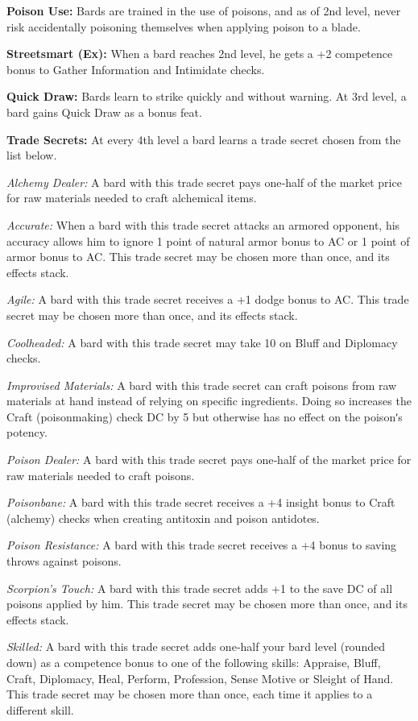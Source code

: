 \documentclass[10pt,a4paper,twocolumn]{d20}
\begin{document}
{\textbf{Poison Use:} Bards are trained in the use of poisons, and as of 2nd level, never risk accidentally poisoning themselves when applying poison to a blade.

\textbf{Streetsmart (Ex):} When a bard reaches 2nd level, he gets a +2 competence bonus to Gather Information and Intimidate checks.

\textbf{Quick Draw:} Bards learn to strike quickly and without warning. At 3rd level, a bard gains Quick Draw as a bonus feat.

\textbf{Trade Secrets:} At every 4th level a bard learns a trade secret chosen from the list below.

\textit{Alchemy Dealer:} A bard with this trade secret pays one‐half of the market price for raw materials needed to craft alchemical items.

\textit{Accurate:} When a bard with this trade secret attacks an armored opponent, his accuracy allows him to ignore 1 point of natural armor bonus to AC or 1 point of armor bonus to AC. This trade secret may be chosen more than once, and its effects stack.

\textit{Agile:} A bard with this trade secret receives a +1 dodge bonus to AC. This trade secret may be chosen more than once, and its effects stack.

\textit{Coolheaded:} A bard with this trade secret may take 10 on Bluff and Diplomacy checks.

\textit{Improvised Materials:} A bard with this trade secret can craft poisons from raw materials at hand instead of relying on specific ingredients. Doing so increases the Craft (poisonmaking) check DC by 5 but otherwise has no effect on the poisonʹs potency.

\textit{Poison Dealer:} A bard with this trade secret pays one‐half of the market price for raw materials needed to craft poisons.

\textit{Poisonbane:} A bard with this trade secret receives a +4 insight bonus to Craft (alchemy) checks when creating antitoxin and poison antidotes.

\textit{Poison Resistance:} A bard with this trade secret receives a +4 bonus to saving throws against poisons.

\textit{Scorpion’s Touch:} A bard with this trade secret adds +1 to the save DC of all poisons applied by him. This trade secret may be chosen more than once, and its effects stack.

\textit{Skilled:} A bard with this trade secret adds one‐half your bard level (rounded down) as a competence bonus to one of the following skills: Appraise, Bluff, Craft, Diplomacy, Heal, Perform, Profession, Sense Motive or Sleight of Hand. This trade secret may be chosen more than once, each time it applies to a different skill.

}
\end{document}
